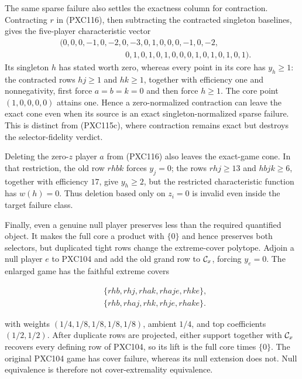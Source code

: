\documentclass[11pt]{article}
\begin{document}
The same sparse failure also settles the exactness column for contraction.
Contracting \(r\) in (PXC116), then subtracting the contracted singleton
baselines, gives the five-player characteristic vector
\[
\begin{split}
 &(0,0,0,-1,0,-2,0,-3,0,1,0,0,0,-1,0,-2,\\
 &\hspace{8em}0,1,0,1,0,1,0,0,0,1,0,1,0,1,0,1).
\end{split}
\]
Its singleton \(h\) has stated worth zero, whereas every point in its core
has \(y_h\ge1\): the contracted rows \(hj\ge1\) and \(hk\ge1\), together
with efficiency one and nonnegativity, first force \(a=b=k=0\) and then
force \(h\ge1\).  The core point \((1,0,0,0,0)\) attains one.  Hence a
zero-normalized contraction can leave the exact cone even when its source is
an exact singleton-normalized sparse failure.  This is distinct from
(PXC115c), where contraction remains exact but destroys the selector-fidelity
verdict.

Deleting the zero-\(z\) player \(a\) from (PXC116) also leaves the exact-game
cone.  In that restriction, the old row \(rhbk\) forces \(y_j=0\); the rows
\(rhj\ge13\) and \(hbjk\ge6\), together with efficiency \(17\), give
\(y_h\ge2\), but the restricted characteristic function has \(w(h)=0\).
Thus deletion based only on \(z_i=0\) is invalid even inside the target
failure class.

Finally, even a genuine null player preserves less than the required
quantified object.  It makes the full core a product with \(\{0\}\) and hence
preserves both selectors, but duplicated tight rows change the extreme-cover
polytope.  Adjoin a null player \(e\) to PXC104 and add the old grand row to
\({\cal C}_x\), forcing \(y_e=0\).  The enlarged game has the faithful extreme
covers


\begin{equation}
\begin{split}
 &\{rhb,rhj,rhak,rhaje,rhke\},\\
 &\{rhb,rhaj,rhk,rhje,rhake\}.
\end{split}                                                  \tag{PXC115e}
\end{equation}

with weights \((1/4,1/8,1/8,1/8,1/8)\), ambient \(1/4\), and top
coefficients \((1/2,1/2)\).  After duplicate rows are projected, either
support together with \({\cal C}_x\) recovers every defining row of PXC104,
so its lift is the full core times \(\{0\}\).  The original PXC104 game has
cover failure, whereas its null extension does not.  Null equivalence is
therefore not cover-extremality equivalence.
\end{document}
